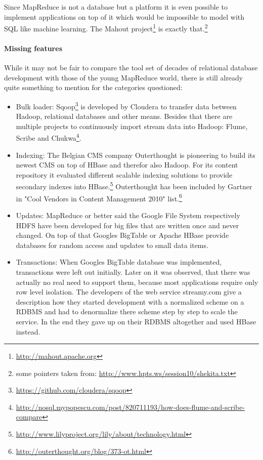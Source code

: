 \documentclass[12pt,a4paper]{scrartcl}		%
\begin{document}
Since MapReduce is not a database but a platform it is even possible to implement applications on top of it which would be impossible to model with SQL like machine learning. The Mahout project\footnote{\url{http://mahout.apache.org}} is exactly that.\footnote{some pointers taken from: \url{http://www.hpts.ws/session10/shekita.txt}}

\paragraph{Missing features}
While it may not be fair to compare the tool set of decades of relational database development with those of the young MapReduce world, there is still already quite something to mention for the categories questioned:

\begin{itemize}
\item Bulk loader: Sqoop\footnote{\url{https://github.com/cloudera/sqoop}} is developed by Cloudera to transfer data between Hadoop, relational databases and other means. Besides that there are multiple projects to continuously import stream data into Hadoop: Flume, Scribe and Chukwa\footnote{\url{http://nosql.mypopescu.com/post/820711193/how-does-flume-and-scribe-compare}}.
\item Indexing: The Belgian CMS company Outerthought is pioneering to build its newest CMS on top of HBase and therefor also Hadoop. For its content repository it evaluated different scalable indexing solutions to provide secondary indexes into HBase.\footnote{\url{http://www.lilyproject.org/lily/about/technology.html}} Outerthought has been included by Gartner in "Cool Vendors in Content Management 2010" list.\footnote{\url{http://outerthought.org/blog/373-ot.html}}
\item Updates: MapReduce or better said the Google File System respectively HDFS have been developed for big files that are written once and never changed. On top of that Googles BigTable or Apache HBase provide databases for random access and updates to small data items.
\item Transactions: When Googles BigTable database was implemented, transactions were left out initially. Later on it was observed, that there was actually no real need to support them, because most applications require only row level isolation.\cite[p. 12]{Chang:2006:BDS:1267308.1267323} The developers of the web service streamy.com give a description how they started development with a normalized scheme on a RDBMS and had to denormalize there scheme step by step to scale the service. In the end they gave up on their RDBMS altogether and used HBase instead.\cite[p. 431-435]{White201010}

\end{itemize}
\end{document}
